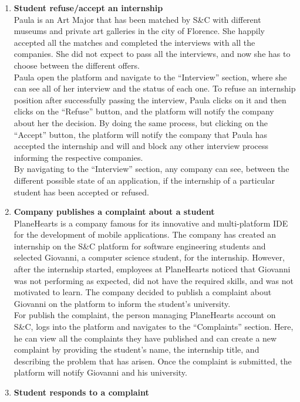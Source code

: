 \begin{enumerate}
    \item \textbf{\textcolor{titleColor}{Student refuse/accept an internship}}\\
        Paula is an Art Major that has been matched by S\&C with different museums and private art galleries in the city of Florence. She happily accepted all the matches and completed the interviews with all the companies. She did not expect to pass all the interviews, and now she has to choose between the different offers.\\
        Paula open the platform and navigate to the “Interview” section, where she can see all of her interview and the status of each one. To refuse an internship position after successfully passing the interview, Paula clicks on it and then clicks on the “Refuse” button, and the platform will notify the company about her the decision. By doing the same process, but clicking on the “Accept” button, the platform will notify the company that Paula has accepted the internship and will and block any other interview process informing the respective companies.\\ 
        By navigating to the “Interview” section, any company can see, between the different possible state of an application, if the internship of a particular student has been accepted or refused.
    \item \textbf{\textcolor{titleColor}{Company publishes a complaint about a student}}\\
        PlaneHearts is a company famous for its innovative and multi-platform IDE for the development of mobile applications. The company has created an internship on the S\&C platform for software engineering students and selected Giovanni, a computer science student, for the internship. However, after the internship started, employees at PlaneHearts noticed that Giovanni was not performing as expected, did not have the required skills, and was not motivated to learn. The company decided to publish a complaint about Giovanni on the platform to inform the student's university.\\
        For publish the complaint, the person managing PlaneHearts account on S\&C, logs into the platform and navigates to the “Complaints” section. Here, he can view all the complaints they have published and can create a new complaint by providing the student's name, the internship title, and describing the problem that has arisen. Once the complaint is submitted, the platform will notify Giovanni and his university.
    \item \textbf{\textcolor{titleColor}{Student responds to a complaint}}\\

\end{enumerate}
